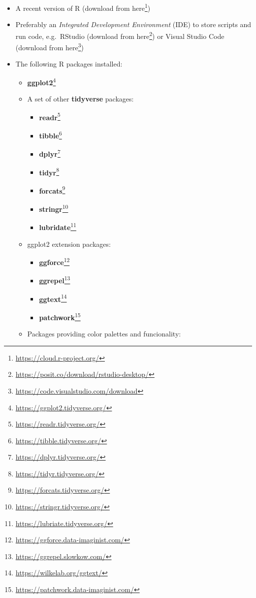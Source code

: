 \documentclass[
]{krantz}
\providecommand{\tightlist}{%
  \setlength{\itemsep}{0pt}\setlength{\parskip}{0pt}}
\renewcommand{\href}[2]{#2\footnote{\url{#1}}}
\begin{document}
\begin{itemize}
\tightlist
\item
  A recent version of R (download from \href{https://cloud.r-project.org/}{here})
\item
  Preferably an \emph{Integrated Development Environment} (IDE) to store scripts and run code, e.g.~RStudio (download from \href{https://posit.co/download/rstudio-desktop/}{here}) or Visual Studio Code (download from \href{https://code.visualstudio.com/download}{here})
\item
  The following R packages installed:

  \begin{itemize}
  \tightlist
  \item
    \href{https://ggplot2.tidyverse.org/}{\textbf{ggplot2}}
  \item
    A set of other \textbf{tidyverse} packages:

    \begin{itemize}
    \tightlist
    \item
      \href{https://readr.tidyverse.org/}{\textbf{readr}}
    \item
      \href{https://tibble.tidyverse.org/}{\textbf{tibble}}
    \item
      \href{https://dplyr.tidyverse.org/}{\textbf{dplyr}}
    \item
      \href{https://tidyr.tidyverse.org/}{\textbf{tidyr}}
    \item
      \href{https://forcats.tidyverse.org/}{\textbf{forcats}}
    \item
      \href{https://stringr.tidyverse.org/}{\textbf{stringr}}
    \item
      \href{https://lubriate.tidyverse.org/}{\textbf{lubridate}}
    \end{itemize}
  \item
    ggplot2 extension packages:

    \begin{itemize}
    \tightlist
    \item
      \href{https://ggforce.data-imaginist.com/}{\textbf{ggforce}}
    \item
      \href{https://ggrepel.slowkow.com/}{\textbf{ggrepel}}
    \item
      \href{https://wilkelab.org/ggtext/}{\textbf{ggtext}}
    \item
      \href{https://patchwork.data-imaginist.com/}{\textbf{patchwork}}
    \end{itemize}
  \item
    Packages providing color palettes and funcionality:


\end{itemize}
\end{itemize}
\end{document}
